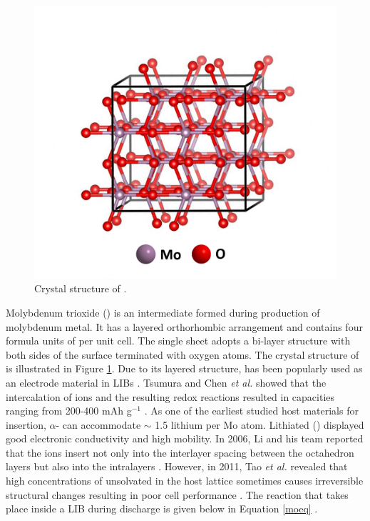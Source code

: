  \begin{figure}[th!]
  \centering
  \includegraphics[width=\textwidth]{Figures/chap6fig/MoO3crys}
    \caption{Crystal structure of .}
  \label{Figures/chap6fig:MoO3crys}
\end{figure}

Molybdenum trioxide () is an intermediate formed during production of molybdenum metal. It has a layered orthorhombic arrangement and contains four formula units of  per unit cell. The single sheet adopts a bi-layer structure with both sides of the surface terminated with oxygen atoms. The crystal structure of  is illustrated in Figure \ref{Figures/chap6fig:MoO3crys}. Due to its layered structure,  has been popularly used as an electrode material in LIBs \cite{wu_mixed_2017,li_vapor-transportation_2006,tsumura_lithium_1997}. Tsumura and Chen \textit{et al.} showed that the intercalation of  ions and the resulting redox reactions resulted in capacities ranging from 200-400 mAh g$^{-1}$ \cite{tsumura_lithium_1997,chen_fast_2010,zhou_-moo3_2010}. As one of the earliest studied host materials for  insertion, $\alpha$- can accommodate $\sim$ 1.5 lithium per Mo atom. Lithiated  () displayed good electronic conductivity and high  mobility. In 2006, Li and his team reported that the  ions insert not only into the interlayer spacing between the  octahedron layers but also into the  intralayers \cite{li_vapor-transportation_2006,chen_fast_2010}. However, in 2011, Tao \textit{et al.} revealed that high concentrations of unsolvated  in the host lattice sometimes causes irreversible structural changes resulting in poor cell performance \cite{tao_moo3_2011,li_theoretical_2014}. The reaction that takes place inside a LIB during discharge is given below in Equation \ref{moeq} \cite{li_vapor-transportation_2006}. 

